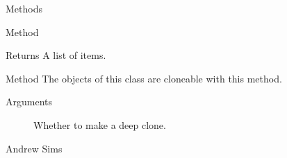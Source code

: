 \documentclass[a4paper]{book}
\begin{document}
\begin{Section}{Methods}
\begin{SubSection}{Method }
%
\begin{SubSubSection}{Returns}
A list of items.
\end{SubSubSection}

\end{SubSection}



\hypertarget{method-clone}{}
%
\begin{SubSection}{Method }
The objects of this class are cloneable with this method.
%


%
\begin{SubSubSection}{Arguments}

\begin{description}

\item[] Whether to make a deep clone.

\end{description}


\end{SubSubSection}

\end{SubSection}

\end{Section}
%
\begin{Author}\relax
Andrew Sims 
\end{Author}
\printindex{}
\end{document}
